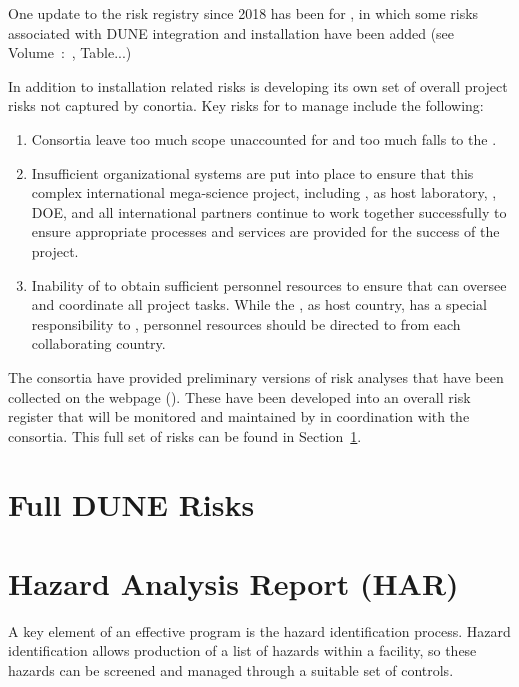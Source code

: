 One update to the risk registry since 2018 has been for , in which some
risks  associated with  DUNE  integration and  installation have  been
added (see Volume~\volnumbersp:~\voltitlesp, Table...)

In addition to installation related risks  is developing its
own set of overall project risks not captured by conortia.  Key risks
for  to manage include the following:
\begin{enumerate}
\item Consortia leave too much scope unaccounted for and too much falls
  to  the .
\item Insufficient organizational systems are put into place to
  ensure that this complex international mega-science project,
  including , \fnal as host laboratory, \surf, DOE, and all international
  partners continue to work together successfully to ensure
  appropriate processes and services are provided for the success of
  the project.
\item Inability of  to obtain sufficient personnel resources to
  ensure that  can oversee and coordinate all project tasks.  While the , 
  as host country, has a special responsibility to , personnel resources should
  be directed to  from each collaborating country. 
\end{enumerate}

The consortia have provided preliminary versions of risk analyses that
have been collected on the  webpage (). These have
been developed into an overall risk register that will be monitored
and maintained by  in coordination with the consortia. This
full set of risks can be found in 
Section~\ref{sec:fdsp-app-risk}.


\section{Full DUNE Risks}
\label{sec:fdsp-app-risk}



\section{Hazard Analysis Report (HAR)}
\label{sec:fdsp-har}

A key element of an effective  program is the hazard
identification process. Hazard identification allows production of a
list of hazards within a facility, so these hazards can be screened
and managed through a suitable set of controls.

